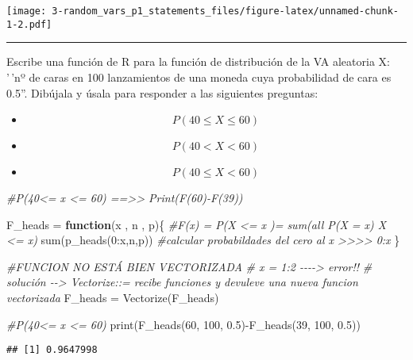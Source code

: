 \documentclass[
]{article}
\newenvironment{Shaded}{\begin{snugshade}}{\end{snugshade}}
\newcommand{\CommentTok}[1]{\textcolor[rgb]{0.56,0.35,0.01}{\textit{#1}}}
\newcommand{\ControlFlowTok}[1]{\textcolor[rgb]{0.13,0.29,0.53}{\textbf{#1}}}
\newcommand{\DecValTok}[1]{\textcolor[rgb]{0.00,0.00,0.81}{#1}}
\newcommand{\FloatTok}[1]{\textcolor[rgb]{0.00,0.00,0.81}{#1}}
\newcommand{\FunctionTok}[1]{\textcolor[rgb]{0.00,0.00,0.00}{#1}}
\newcommand{\NormalTok}[1]{#1}
\newcommand{\OtherTok}[1]{\textcolor[rgb]{0.56,0.35,0.01}{#1}}
\newcommand{\SpecialCharTok}[1]{\textcolor[rgb]{0.00,0.00,0.00}{#1}}
\providecommand{\tightlist}{%
  \setlength{\itemsep}{0pt}\setlength{\parskip}{0pt}}
\begin{document}
\texttt{[image: 3-random\_vars\_p1\_statements\_files/figure-latex/unnamed-chunk-1-2.pdf]}

\begin{center}\rule{0.5\linewidth}{0.5pt}\end{center}

Escribe una función de R para la función de distribución de la VA
aleatoria X: '\,'nº de caras en 100 lanzamientos de una moneda cuya
probabilidad de cara es 0.5''. Dibújala y úsala para responder a las
siguientes preguntas:

\begin{itemize}
\tightlist
\item
  \[ P(40 \leq X \leq 60) \]
\item
  \[ P(40 < X < 60) \]
\item
  \[ P(40 \leq X < 60)\]
\end{itemize}

\begin{Shaded}
\begin{Highlighting}[]
\CommentTok{\#P(40\textless{}= x \textless{}= 60) ==\textgreater{}\textgreater{}  Print(F(60){-}F(39))}

\NormalTok{F\_heads }\OtherTok{=} \ControlFlowTok{function}\NormalTok{(x , n , p)\{}
  \CommentTok{\#F(x) = P(X \textless{}= x )= sum(all P(X = x) X \textless{}= x)}
  \FunctionTok{sum}\NormalTok{(}\FunctionTok{p\_heads}\NormalTok{(}\DecValTok{0}\SpecialCharTok{:}\NormalTok{x,n,p))     }\CommentTok{\#calcular probabildades del cero al x \textgreater{}\textgreater{}\textgreater{}\textgreater{} 0:x}
\NormalTok{\}}

\CommentTok{\#FUNCION NO ESTÁ BIEN VECTORIZADA }
  \CommentTok{\# x = 1:2 {-}{-}{-}{-}\textgreater{} error!!}
  \CommentTok{\# solución {-}{-}\textgreater{} Vectorize::= recibe funciones y devuleve una nueva funcion vectorizada}
\NormalTok{  F\_heads }\OtherTok{=} \FunctionTok{Vectorize}\NormalTok{(F\_heads)}

\CommentTok{\#P(40\textless{}= x \textless{}= 60)}
\FunctionTok{print}\NormalTok{(}\FunctionTok{F\_heads}\NormalTok{(}\DecValTok{60}\NormalTok{, }\DecValTok{100}\NormalTok{, }\FloatTok{0.5}\NormalTok{)}\SpecialCharTok{{-}}\FunctionTok{F\_heads}\NormalTok{(}\DecValTok{39}\NormalTok{, }\DecValTok{100}\NormalTok{, }\FloatTok{0.5}\NormalTok{))}
\end{Highlighting}
\end{Shaded}

\begin{verbatim}
## [1] 0.9647998
\end{verbatim}
\end{document}
